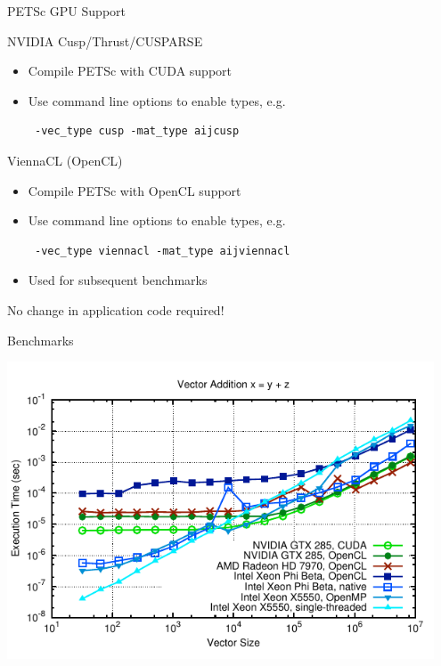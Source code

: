 \begin{frame}[fragile]{PETSc GPU Support}
 
  \begin{block}{NVIDIA Cusp/Thrust/CUSPARSE}
   \begin{itemize}
   \item Compile PETSc with CUDA support
   \item Use command line options to enable types, e.g.
    \begin{lstlisting}
 -vec_type cusp -mat_type aijcusp
    \end{lstlisting}
  \end{itemize}
  \end{block}

  \begin{block}{ViennaCL (OpenCL)}
  \begin{itemize}
   \item Compile PETSc with OpenCL support
   \item Use command line options to enable types, e.g.
    \begin{lstlisting}
 -vec_type viennacl -mat_type aijviennacl
    \end{lstlisting}
   \item Used for subsequent benchmarks
  \end{itemize}
  \end{block}

 \begin{center} No change in application code required! \end{center}
                                                        
\end{frame}


\begin{frame}{Benchmarks}
  \begin{center}
   \includegraphics[width=0.95\textwidth]{figures/vector-timings-7}
  \end{center}
\end{frame}

